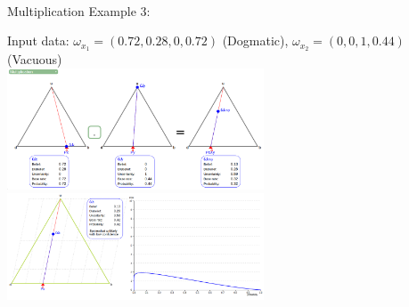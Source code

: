 \documentclass[UTF8]{article}
\newcommand{\opinion}[5]{$\omega_{#1} = (#2, #3, #4, #5)$}
\begin{document}
    \hrulefill\\
Multiplication Example 3:
    \begin{center}
        Input data: 
        \opinion{x_1}{0.72}{0.28}{0}{0.72} (Dogmatic), 
        \opinion{x_2}{0}{0}{1}{0.44} (Vacuous)\\
        \includegraphics[width=3in]{images/mul3.png}
        \includegraphics[width=3in]{images/mul3viz.png}
\end{center}
\end{document}
